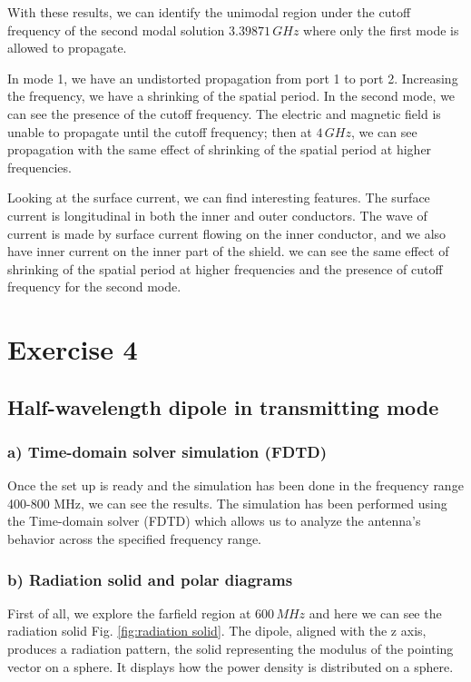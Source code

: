 \documentclass{article}
\begin{document}
With these results, we can identify the unimodal region under the cutoff frequency of the second modal solution $3.39871\,GHz$ where only the first mode is allowed to propagate.

In mode 1, we have an undistorted propagation from port 1 to port 2. Increasing the frequency, we have a shrinking of the spatial period. In the second mode, we can see the presence of the cutoff frequency. The electric and magnetic field is unable to propagate until the cutoff frequency; then at $4\,GHz$, we can see propagation with the same effect of shrinking of the spatial period at higher frequencies.

Looking at the surface current, we can find interesting features. The surface current is longitudinal in both the inner and outer conductors. The wave of current is made by surface current flowing on the inner conductor, and we also have inner current on the inner part of the shield. 
we can see the same effect of shrinking of the spatial period at higher frequencies and the presence of cutoff frequency for the second mode.






\section{Exercise 4}
\subsection{Half-wavelength dipole in transmitting mode}

\subsubsection{a) Time-domain solver simulation (FDTD)}
Once the set up is ready and the simulation has been done in the frequency range 400-800 MHz, we can see the results. The simulation has been performed using the Time-domain solver (FDTD) which allows us to analyze the antenna's behavior across the specified frequency range.

\subsubsection{b) Radiation solid and polar diagrams}
First of all, we explore the farfield region at $600\,MHz$ and here we can see the radiation solid Fig. \ref{fig:radiation solid}. The dipole, aligned with the z axis, produces a radiation pattern, the solid representing the modulus of the pointing vector on a sphere. It displays how the power density is distributed on a sphere. 
\end{document}
